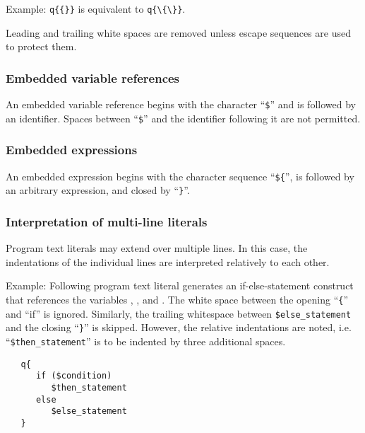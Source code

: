 Example: \lstinline!q{{}}! is equivalent to \lstinline!q{\{\}}!.

Leading and trailing white spaces are removed unless escape sequences
are used to protect them.

\subsubsection{Embedded variable references}

An embedded variable reference begins with the character
``\lstinline!$!''%
and is followed by an identifier. Spaces between
``\lstinline!$!''%
and the identifier following it are not permitted.

\subsubsection{Embedded expressions}

An embedded expression begins with the character sequence
``\lstinline!${!'', %
is followed by an arbitrary expression, and closed by
``\lstinline!}!''.

\subsubsection{Interpretation of multi-line literals}

Program text literals may extend over multiple lines. In this
case, the indentations of the individual lines are interpreted
relatively to each other.

Example: Following program text literal generates an
if-else-statement construct that references the variables
, , and .
The white space between the opening ``\lstinline!{!''
and ``if'' is ignored. Similarly, the trailing whitespace between
\lstinline!$else_statement! %
and the closing
``\lstinline!}!''
is skipped.
However, the relative indentations are noted, i.e.
``\lstinline!$then_statement!'' %
is to be indented by three additional spaces.

\begin{lstlisting}
   q{
      if ($condition)
         $then_statement
      else
         $else_statement
   }
\end{lstlisting}

\endinput
